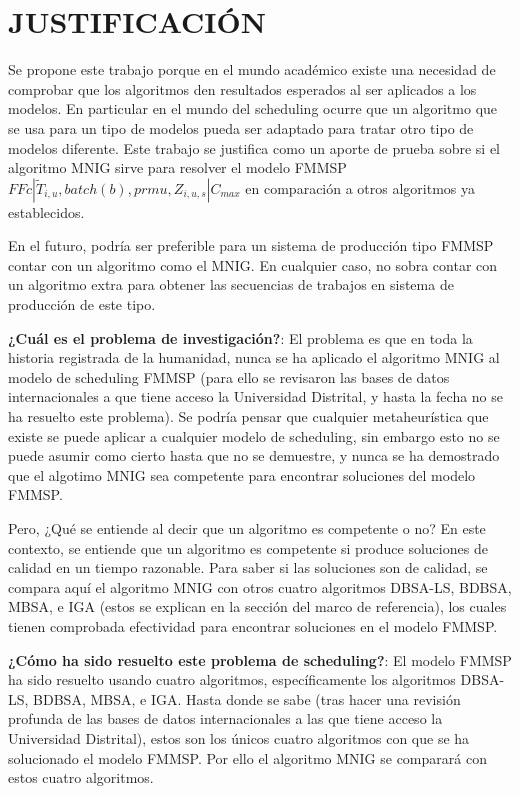 \documentclass{article}
\def\notac_modelo{$FFc | \tilde{T}_{i, u}, batch(b), prmu, Z_{i, u, s} | C_{max}$}
\begin{document}
\section{JUSTIFICACIÓN}

Se propone este trabajo porque en el mundo académico existe una necesidad de comprobar que los algoritmos den resultados esperados al ser aplicados a los modelos. En particular en el mundo del scheduling ocurre que un algoritmo que se usa para un tipo de modelos pueda ser adaptado para tratar otro tipo de modelos diferente. Este trabajo se justifica como un aporte de prueba sobre si el algoritmo MNIG sirve para resolver el modelo FMMSP \notac_modelo en comparación a otros algoritmos ya establecidos.

\vspace{\baselineskip}
En el futuro, podría ser preferible para un sistema de producción tipo \linebreak FMMSP contar con un algoritmo como el MNIG. En cualquier caso, no sobra contar con un algoritmo extra para obtener las secuencias de trabajos en sistema de producción de este tipo.

\vspace{\baselineskip}
\textbf{¿Cuál es el problema de investigación?}: El problema es que en toda la historia registrada de la humanidad, nunca se ha aplicado el algoritmo MNIG al modelo de scheduling FMMSP (para ello se revisaron las bases de datos internacionales a que tiene acceso la Universidad Distrital, y hasta la fecha no se ha resuelto este problema). Se podría pensar que cualquier metaheurística que existe se puede aplicar a cualquier modelo de scheduling, sin embargo esto no se puede asumir como cierto hasta que no se demuestre, y nunca se ha demostrado que el algotimo MNIG sea competente para encontrar soluciones del modelo FMMSP.

\vspace{\baselineskip}
Pero, ¿Qué se entiende al decir que un algoritmo es competente o no? En este contexto, se entiende que un algoritmo es competente si produce soluciones de calidad en un tiempo razonable. Para saber si las soluciones son de calidad, se compara aquí el algoritmo MNIG con otros cuatro algoritmos DBSA-LS, BDBSA, MBSA, e IGA (estos se explican en la sección del marco de referencia), los cuales tienen comprobada efectividad para encontrar soluciones en el modelo FMMSP.

\vspace{\baselineskip}
\textbf{¿Cómo ha sido resuelto este problema de scheduling?}: El modelo FMMSP ha sido resuelto usando cuatro algoritmos, específicamente los algoritmos DBSA-LS, BDBSA, MBSA, e IGA. Hasta donde se sabe (tras hacer una revisión profunda de las bases de datos internacionales a las que tiene acceso la Universidad Distrital), estos son los únicos cuatro algoritmos con que se ha solucionado el modelo FMMSP. Por ello el algoritmo MNIG se comparará con estos cuatro algoritmos.
\end{document}
